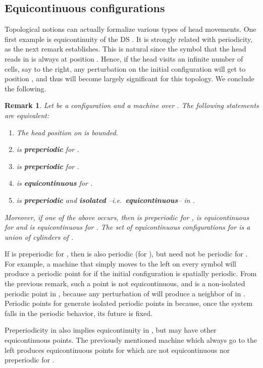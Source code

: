 \documentclass{llncs}
\newtheorem{rem}{Remark}
\newcommand{\ie}{\textit{i.e.}\ }
\begin{document}
\subsection{Equicontinuous configurations}\label{ss:eqpt}
Topological notions can actually formalize various types of head movements.
One first example is equicontinuity of the DS .
It is strongly related with periodicity, as the next remark establishes.
This is natural since the symbol that the head reads in  is always at position .
Hence, if the head visits an infinite number of cells, say to the right, any perturbation on the initial configuration will get to position , and thus will become largely significant for this topology.
We conclude the following. \begin{rem}\label{r:eqpt}
Let  be a configuration and  a machine over . The following statements are equivalent:
\begin{enumerate}
\item The head position on  is bounded.
\item  is \textbf{preperiodic} for .
\item  is \textbf{preperiodic} for .
\item  is \textbf{equicontinuous} for .
\item  is \textbf{preperiodic} and \textbf{isolated} --\ie \textbf{equicontinuous}-- in .
\end{enumerate}
Moreover, if one of the above occurs, then  is preperiodic for ,  is equicontinuous for  and  is equicontinuous for .
The set of equicontinuous configurations for  is a union of cylinders of .
\end{rem}
If  is preperiodic for , then  is also periodic (for ), but  need not be periodic for .
For example, a machine that simply moves to the left on every symbol will produce a periodic point for  if the initial configuration  is spatially periodic.
From the previous remark, such a point is not equicontinuous, and  is a non-isolated periodic point in , because any perturbation of  will produce a neighbor of  in .
Periodic points for  generate isolated periodic points in  because, once the system falls in the periodic behavior, its future is fixed.

Preperiodicity in  also implies equicontinuity in , but  may have other equicontinuous points.
The previously mentioned machine which always go to the left produces equicontinuous points for  which are not equicontinuous nor preperiodic for .
\end{document}
